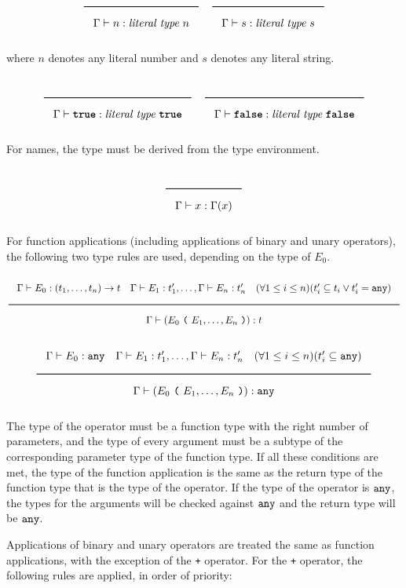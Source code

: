 \noindent
\[
  \Rule{}{\Gamma \vdash n : \textit{literal type}\ n}
  \quad
  \Rule{}{\Gamma \vdash s : \textit{literal type}\ s}
\]
\noindent

where $n$ denotes any literal number and $s$ denotes any literal string.

\noindent
\[
  \Rule{}{\Gamma \vdash \TruE : \textit{literal type}\ \TruE}
  \quad
  \Rule{}{\Gamma \vdash \FalsE : \textit{literal type}\ \FalsE}
\]
\noindent

For names, the type must be derived from the type environment.

\noindent
\[
  \Rule{}{\Gamma \vdash x : \Gamma(x)}
\]
\noindent

For function applications (including applications of binary and unary operators), the following two type rules are used, depending on the type of $E_0$.

\noindent
\[
\Rule{\Gamma \vdash E_0 : (t_1, \ldots, t_n) \rightarrow t \quad \Gamma \vdash E_1 : t'_1, \ldots,  \Gamma \vdash E_n : t'_n
  \quad (\forall 1 \leq i \leq n)(t'_i \subseteq t_i \vee t'_i = \Any)}{\Gamma \vdash (E_0\ \Lp \ E_1, \ldots, E_n\ \Rp) : t}
\]
\noindent
\[
  \Rule{\Gamma \vdash E_0 : \Any \quad \Gamma \vdash E_1 : t'_1, \ldots,  \Gamma \vdash E_n : t'_n
  \quad (\forall 1 \leq i \leq n)(t'_i \subseteq \Any)}{\Gamma \vdash (E_0\ \Lp \ E_1, \ldots, E_n\ \Rp) : \Any}
\]
\noindent

The type of the operator must be a function type with the right number of parameters,
and the type of every argument must be a subtype of the corresponding parameter type of the function type.
If all these conditions are met, the type of the function application is the same
as the return type of the function type that is the type of the operator.
If the type of the operator is $\texttt{any}$, the types for the arguments will be checked against $\texttt{any}$ and the return type will be $\texttt{any}$.

Applications of binary and unary operators are treated the same as function applications, with the exception of the \texttt{+} operator.
For the \texttt{+} operator, the following rules are applied, in order of priority:

